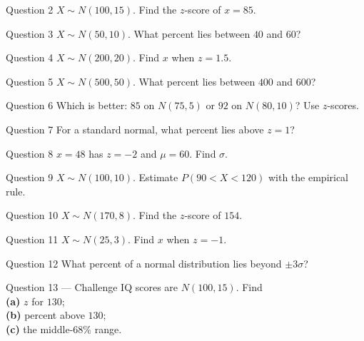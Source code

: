 \documentclass[11pt]{article}
\begin{document}
\begin{qbox}{Question 2}
$X\sim N(100,15)$. Find the $z$-score of $x=85$.\workspace{2.4cm}
\end{qbox}

\begin{qbox}{Question 3}
$X\sim N(50,10)$. What percent lies between $40$ and $60$?\workspace{2.4cm}
\end{qbox}

\begin{qbox}{Question 4}
$X\sim N(200,20)$. Find $x$ when $z=1.5$.\workspace{2.4cm}
\end{qbox}

\begin{qbox}{Question 5}
$X\sim N(500,50)$. What percent lies between $400$ and $600$?\workspace{2.4cm}
\end{qbox}

\begin{qbox}{Question 6}
Which is better: $85$ on $N(75,5)$ or $92$ on $N(80,10)$? Use $z$-scores.\workspace{2.4cm}
\end{qbox}

\begin{qbox}{Question 7}
For a standard normal, what percent lies above $z=1$?\workspace{2.4cm}
\end{qbox}

\begin{qbox}{Question 8}
$x=48$ has $z=-2$ and $\mu=60$. Find $\sigma$.\workspace{2.4cm}
\end{qbox}

\begin{qbox}{Question 9}
$X\sim N(100,10)$. Estimate $P(90<X<120)$ with the empirical rule.\workspace{2.4cm}
\end{qbox}

\begin{qbox}{Question 10}
$X\sim N(170,8)$. Find the $z$-score of $154$.\workspace{2.4cm}
\end{qbox}

\begin{qbox}{Question 11}
$X\sim N(25,3)$. Find $x$ when $z=-1$.\workspace{2.4cm}
\end{qbox}

\begin{qbox}{Question 12}
What percent of a normal distribution lies beyond $\pm3\sigma$?\workspace{2.4cm}
\end{qbox}

\begin{qbox}{Question 13 --- Challenge}
IQ scores are $N(100,15)$. Find \\ \textbf{(a)} $z$ for $130$; \\ \textbf{(b)} percent above $130$; \\ \textbf{(c)} the middle-$68\%$ range.\workspace{3cm}
\end{qbox}
\end{document}
